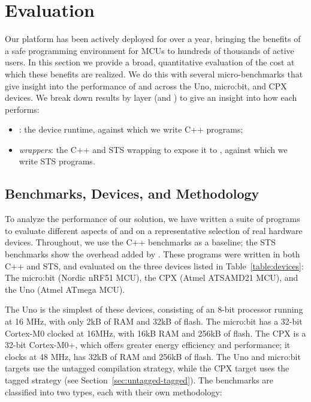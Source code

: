 \section{Evaluation}
\label{sec:evaluate}

Our platform has been actively deployed for over a year, bringing the benefits of a safe programming environment for MCUs to hundreds of thousands of active users. In this section we provide a broad, quantitative evaluation of the cost at which these benefits are realized. We do this with several micro-benchmarks that give insight into the performance of \MC and \CO across the Uno, micro:bit, and CPX devices. We break down results by layer (\CO and \MCN) to give an insight into how each performs:
\begin{itemize}
\item \emph{\CON}: the device runtime, against which we write C++ programs;
\item \emph{\MC wrappers}: the C++ and STS wrapping \CO to expose it to \MCN, against which we write STS programs.
\end{itemize}

\subsection{Benchmarks, Devices, and Methodology}

To analyze the performance of our solution, we have written a suite of programs to evaluate different aspects of \MC and \CO  on a representative selection of real hardware devices. Throughout, we use the C++ \CO benchmarks as a baseline; the STS benchmarks show the overhead added by \MCN. These programs were written in both C++ and STS, and evaluated on the three devices listed in Table~\ref{table:devices}: The micro:bit (Nordic nRF51 MCU), the CPX (Atmel ATSAMD21 MCU), and the Uno (Atmel ATmega MCU).

The Uno is the simplest of these devices,
consisting of an 8-bit processor running at 16 MHz, with only 2kB of RAM and 32kB of flash.
The micro:bit has a 32-bit Cortex-M0 clocked at 16MHz, with 16kB RAM and 256kB of flash. The CPX is a 32-bit Cortex-M0+, which offers greater energy efficiency and performance; it clocks at 48 MHz, has 32kB of RAM and 256kB of flash. The Uno and micro:bit \MC targets use the untagged compilation strategy, while the CPX target uses the tagged strategy (see Section~\ref{sec:untagged-tagged}). The benchmarks are classified into two types, each with their own methodology:


